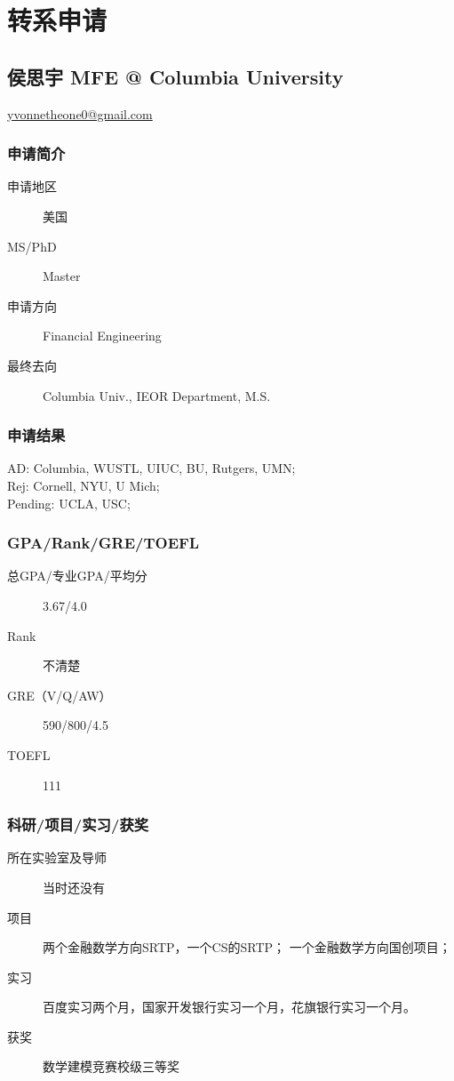 \documentclass[11pt,fleqn,openany]{book} %
\begin{document}
\chapter{转系申请}
\section{侯思宇 MFE @ Columbia University}
\hfill \href{mailto:yvonnetheone0@gmail.com}{yvonnetheone0@gmail.com}

\noindent\begin{minipage}[t]{0.45\textwidth}
\subsection*{申请简介}
\begin{description}
\item[申请地区] 美国
\item[MS/PhD] Master
\item[申请方向] Financial Engineering
\item[最终去向] Columbia Univ., IEOR Department, M.S.
\end{description}
\end{minipage}
\hfill
\begin{minipage}[t]{0.45\textwidth}
\subsection*{申请结果}
\noindent AD: Columbia, WUSTL, UIUC, BU, Rutgers, UMN;\\
Rej: Cornell, NYU, U Mich;\\
Pending: UCLA, USC;
\end{minipage}
\subsection*{GPA/Rank/GRE/TOEFL}
\begin{description}
\item[总GPA/专业GPA/平均分] 3.67/4.0
\item[Rank] 不清楚
\item[GRE（V/Q/AW）] 590/800/4.5
\item[TOEFL] 111
\end{description}

\subsection*{科研/项目/实习/获奖}
\begin{description}
\item[所在实验室及导师] 当时还没有
\item[项目] 两个金融数学方向SRTP，一个CS的SRTP；
一个金融数学方向国创项目；
\item[实习] 百度实习两个月，国家开发银行实习一个月，花旗银行实习一个月。
\item[获奖] 数学建模竞赛校级三等奖
\end{description}
\end{document}

